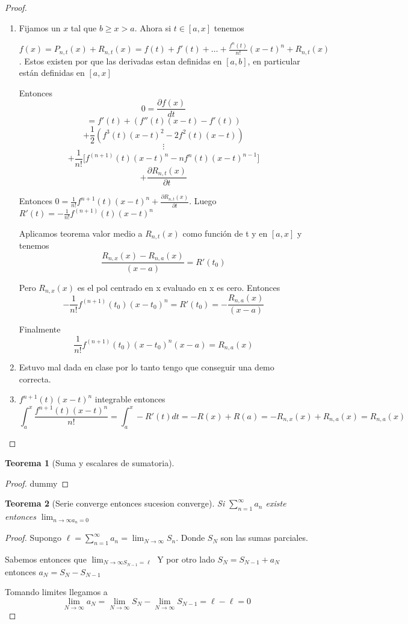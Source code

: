 \documentclass{article}
\theoremstyle{break}
\newtheorem{theorem}{Teorema}[section]
\begin{document}
\begin{proof}
	\begin{enumerate}
		\item 
	Fijamos un $x$ tal que $b\geq x > a$. Ahora si $t\in[a,x]$ tenemos

	$f(x) = P_{n,t}(x) + R_{n,t}(x) = f(t) + f'(t)+\ldots+\frac{f^n(t)}{n!}(x-t)^n + R_{n,t}(x)$. Estos existen por que las derivadas estan definidas en $[a,b]$,
	en particular están definidas en $[a,x]$

	Entonces \[0 = \frac{\partial f(x)}{dt} \]
	\[= f'(t) + (f''(t)(x-t)-f'(t))\]
	\[ +\frac{1}{2} (f^3(t)(x-t)^2-2f^2(t)(x-t))  \]
	\[\vdots\]
	\[ +\frac{1}{n!} \bigg[f^{(n+1)}(t)(x-t)^n-nf^n(t)(x-t)^{n-1}\bigg]  \]
	\[ + \frac{\partial R_{n,t}(x)}{\partial t} \]
	
	Entonces $0 = \frac{1}{n!} f^{n+1}(t)(x-t)^n + \frac{\partial R_{n,t}(x)}{\partial t}$. 
	Luego $R'(t) = - \frac{1}{n!}f^{(n+1)}(t)(x-t)^n$

	Aplicamos teorema valor medio a $R_{n,t}(x)$ como función de t y en $[a,x]$ y tenemos
	\[ \frac{R_{n,x}(x) - R_{n,a}(x)}{(x-a)} = R'(t_0)  \]

	Pero $R_{n,x}(x)$ es el pol centrado en x evaluado en x es cero. Entonces 
	\[ - \frac{1}{n!}f^{(n+1)}(t_0)(x-t_0)^n =  R'(t_0) = - \frac{R_{n,a}(x)}{(x-a)} \]

	Finalmente \[ \frac{1}{n!}f^{(n+1)}(t_0)(x-t_0)^n(x-a) = R_{n,a}(x)\]

	\item Estuvo mal dada en clase por lo tanto tengo que conseguir una demo correcta.
	
	\item $f^{n+1}(t)(x-t)^n$ integrable entonces 
	\[ \int_{a}^{x} \frac{f^{n+1}(t)(x-t)^n}{n!} = \int_{a}^{x} - R'(t)dt = 
	 -R(x) + R(a) = -R_{n,x}(x) +  R_{n,a}(x) = R_{n,a}(x)  \]
	\end{enumerate}
\end{proof}

\begin{theorem}[Suma y escalares de sumatoria]
	
\end{theorem}
\begin{proof}
	dummy
\end{proof}

\begin{theorem}[Serie converge entonces sucesion converge]
	Si $\sum_{n=1}^{\infty}a_n$ existe entonces $\lim_{n \rightarrow \infty a_n = 0 }$
\end{theorem}
\begin{proof}
	Supongo $\ell = \sum_{n=1}^{\infty}a_n = \lim_{N \rightarrow \infty }S_n$.
	Donde $S_N$ son las sumas parciales.

	Sabemos entonces que $\lim_{N \rightarrow \infty S_{N-1} = \ell }$
	Y por otro lado $S_N=S_{N-1} + a_N$ entonces $a_N = S_N - S_{N-1}$

	Tomando limites llegamos a \[\lim_{N \rightarrow \infty} a_N = \lim_{N \rightarrow \infty} S_N  -
	\lim_{N \rightarrow \infty} S_{N-1}  = \ell - \ell = 0 \]
\end{proof}
\end{document}
